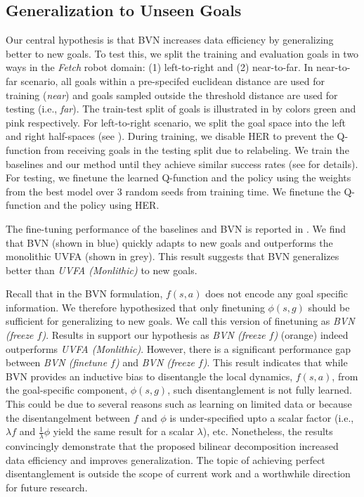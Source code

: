 \documentclass[dvipsnames]{article} %
\theoremstyle{definition}
\theoremstyle{remark}
\newcommand{\mono}{\textit{UVFA (Monlithic)}\xspace}
\newcommand{\fetch}{\textit{Fetch}\xspace}
\begin{document}
\subsection{Generalization to Unseen Goals}
\label{subsec::adapt}
Our central hypothesis is that BVN increases data efficiency by generalizing better to new goals. To test this, we split the training and evaluation goals in two ways in the \fetch robot domain: (1) left-to-right and (2) near-to-far. In near-to-far scenario, all goals within a pre-specifed euclidean distance are used for training (\textit{near}) and goals sampled outside the threshold distance are used for testing (i.e., \textit{far}). The train-test split of goals is illustrated in    by colors green and pink respectively. For left-to-right scenario, we split the goal space into the left and right half-spaces (see ). During training, we disable HER to prevent the Q-function from receiving goals in the testing split due to relabeling. We train the baselines and our method until they achieve similar success rates (see  for details). For testing, we finetune the learned Q-function and the policy using the weights from the best model over $3$ random seeds from training time. We finetune the Q-function and the policy using HER. 

The fine-tuning performance of the baselines and BVN is reported in . We find that BVN (shown in blue) quickly adapts to new goals and outperforms the monolithic UVFA (shown in grey). This result suggests that BVN generalizes better than \mono to new goals. 

Recall that in the BVN formulation, $f(s,a)$ does not encode any goal specific information. We therefore hypothesized that only finetuning $\phi(s,g)$ should be sufficient for generalizing to new goals. We call this version of finetuning as \textit{BVN (freeze $f$)}. Results in  support our hypothesis as \textit{BVN (freeze $f$)} (orange) indeed outperforms \mono. However, there is a significant performance gap between \textit{BVN (finetune $f$)} and \textit{BVN (freeze $f$)}. This result indicates that while BVN provides an inductive bias to disentangle the local dynamics, $f(s,a)$, from the goal-specific component, $\phi(s,g)$, such disentanglement is not fully learned. This could be due to several reasons such as learning on limited data or because the disentangelment between $f$ and $\phi$ is under-specified upto a scalar factor (i.e., $\lambda f$ and $\frac{1}{\lambda}\phi$ yield the same result for a scalar $\lambda$), etc. Nonetheless, the results convincingly demonstrate that the proposed bilinear decomposition increased data efficiency and improves generalization. The topic of achieving perfect disentanglement is outside the scope of current work and a worthwhile direction for future research. 
\end{document}
